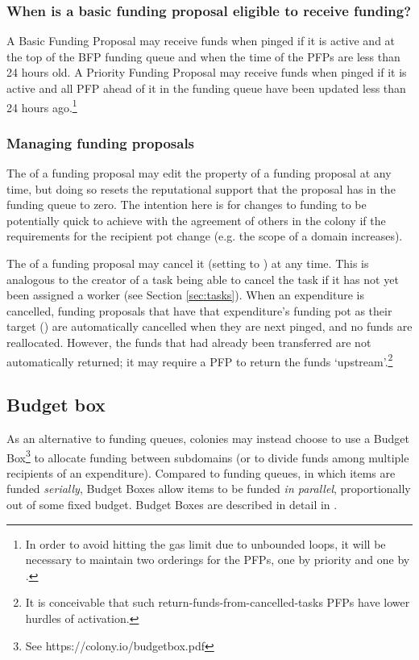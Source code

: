 \subsubsection*{When is a basic funding proposal eligible to receive funding?}
A Basic Funding Proposal may receive funds when pinged if it is active and at the top of the BFP funding queue and when the  time of the PFPs are less than 24 hours old. A Priority Funding Proposal may receive funds when pinged if it is active and all PFP ahead of it in the funding queue have been updated less than 24 hours ago.\footnote{In order to avoid hitting the gas limit due to unbounded loops, it will be necessary to maintain two orderings for the PFPs, one by priority and one by . }

\subsubsection{Managing funding proposals}

The  of a funding proposal may edit the  property of a funding proposal at any time, but doing so resets the reputational support that the proposal has in the funding queue to zero. The intention here is for changes to funding to be potentially quick to achieve with the agreement of others in the colony if the requirements for the recipient pot change (e.g. the scope of a domain increases).

The  of a funding proposal may cancel it (setting  to ) at any time. This is analogous to the creator of a task being able to cancel the task if it has not yet been assigned a worker (see Section \ref{sec:tasks}). When an expenditure is cancelled, funding proposals that have that expenditure's funding pot as their target () are automatically cancelled when they are next pinged, and no funds are reallocated. However, the funds that had already been transferred are not automatically returned; it may require a PFP to return the funds `upstream'.\footnote{It is conceivable that such return-funds-from-cancelled-tasks PFPs have lower hurdles of activation.}

\subsection{Budget box}\label{sec:budget-box}

As an alternative to funding queues, colonies may instead choose to use a Budget Box\footnote{See https://colony.io/budgetbox.pdf} to allocate funding between subdomains (or to divide funds among multiple recipients of an expenditure). Compared to funding queues, in which items are funded \textit{serially}, Budget Boxes allow items to be funded \textit{in parallel}, proportionally out of some fixed budget. Budget Boxes are described in detail in \cite{BudgetBox}. \\


